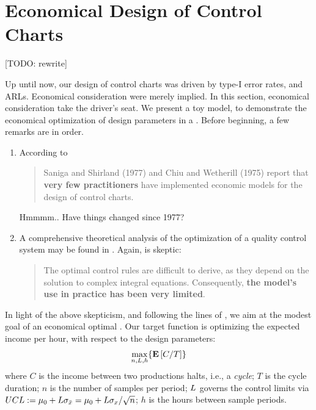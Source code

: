 \section{Economical Design of Control Charts}
\label{sec:economical_considerations}

[TODO: rewrite]


Up until now, our design of control charts was driven by type-I error rates, and ARLs. 
Economical consideration were merely implied.
In this section, economical consideration take the driver's seat. 
We present a toy model, to demonstrate the economical optimization of design parameters in a \barxChart. 
Before beginning, a few remarks are in order. 

\begin{remark}
\noindent
\begin{enumerate}
\item According to \cite{montgomery_introduction_2007} 
\begin{quote}
Saniga and Shirland (1977) and Chiu and Wetherill (1975) report that \textbf{very few practitioners} have implemented economic models for the design of control charts.
\end{quote}
Hmmmm.. Have things changed since 1977?
\item A comprehensive theoretical analysis of the optimization of a quality control system may be found in \cite{girshick_bayes_1952}. Again, \cite{montgomery_introduction_2007} is skeptic:
\begin{quote}
The optimal control rules are difficult to derive, as they depend on the solution to complex integral equations. Consequently, \textbf{the model’s use in practice has been very limited}.
\end{quote}
\end{enumerate}
\end{remark}

In light of the above skepticism, and following the lines of \cite{duncan_economic_1956}, we aim at the modest goal of an economical optimal \barxChart. 
Our target function is optimizing the expected income per hour, with respect to the design parameters:
\begin{align}
\label{eq:optimal_design}
	\max_{n,L,h}\{ \mathbf{E}\left[ C/T \right] \}
\end{align}
where $C$ is the income between two productions
 halts, i.e., a \emph{cycle};
$T$ is the cycle duration;
$n$ is the number of samples per period;
$L$ governs the control limits via $UCL:= \mu_0+ L \sigma_{\bar{x}}= \mu_0+ L \sigma_x / \sqrt{n}$;
$h$ is the hours between sample periods. 

